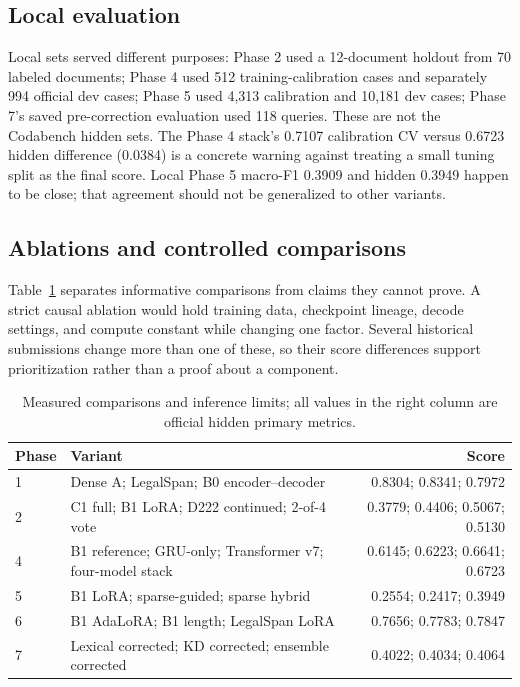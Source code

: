 \documentclass[11pt,oneside]{article}
\begin{document}
\subsection{Local evaluation}
Local sets served different purposes: Phase 2 used a 12-document holdout from 70 labeled documents; Phase 4 used 512 training-calibration cases and separately 994 official dev cases; Phase 5 used 4,313 calibration and 10,181 dev cases; Phase 7's saved pre-correction evaluation used 118 queries. These are not the Codabench hidden sets. The Phase 4 stack's 0.7107 calibration CV versus 0.6723 hidden difference (0.0384) is a concrete warning against treating a small tuning split as the final score. Local Phase 5 macro-F1 0.3909 and hidden 0.3949 happen to be close; that agreement should not be generalized to other variants.

\subsection{Ablations and controlled comparisons}
Table~\ref{tab:ablate} separates informative comparisons from claims they cannot prove. A strict causal ablation would hold training data, checkpoint lineage, decode settings, and compute constant while changing one factor. Several historical submissions change more than one of these, so their score differences support prioritization rather than a proof about a component.
\begin{table}[H]\centering\small
\caption{Measured comparisons and inference limits; all values in the right column are official hidden primary metrics.}
\label{tab:ablate}
\begin{tabularx}{\linewidth}{lXr}\toprule Phase & Variant & Score \\\midrule
1 & Dense A; LegalSpan; B0 encoder--decoder & 0.8304; 0.8341; 0.7972 \\
2 & C1 full; B1 LoRA; D222 continued; 2-of-4 vote & 0.3779; 0.4406; 0.5067; 0.5130 \\
4 & B1 reference; GRU-only; Transformer v7; four-model stack & 0.6145; 0.6223; 0.6641; 0.6723 \\
5 & B1 LoRA; sparse-guided; sparse hybrid & 0.2554; 0.2417; 0.3949 \\
6 & B1 AdaLoRA; B1 length; LegalSpan LoRA & 0.7656; 0.7783; 0.7847 \\
7 & Lexical corrected; KD corrected; ensemble corrected & 0.4022; 0.4034; 0.4064 \\
\bottomrule\end{tabularx}
\end{table}
\end{document}

